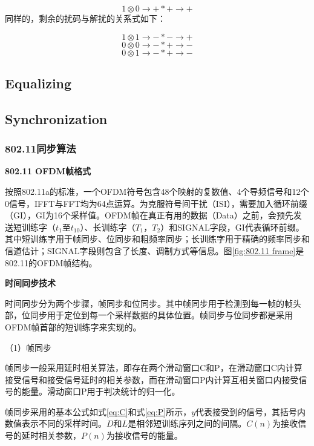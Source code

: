 \documentclass[titlepage]{article}
\numberwithin{figure}{section}
\numberwithin{equation}{section}
\begin{document}
\begin{displaymath}
1 \otimes 0 \to + * + \to +
\end{displaymath}
同样的，剩余的扰码与解扰的关系式如下：

\begin{displaymath}
1 \otimes 1 \to - * - \to +
\end{displaymath}
\begin{displaymath}
0 \otimes 0 \to - * + \to -
\end{displaymath}
\begin{displaymath}
0 \otimes 1 \to - * + \to - 
\end{displaymath}

\subsection{Equalizing}

\subsection{Synchronization}

\subsubsection{802.11同步算法}

\textbf{802.11 OFDM帧格式}

按照802.11a的标准，一个OFDM符号包含48个映射的复数值、4个导频信号和12个0信号，IFFT与FFT均为64点运算。为克服符号间干扰（ISI），需要加入循环前缀（GI），GI为16个采样值。OFDM帧在真正有用的数据（Data）之前，会预先发送短训练字（$t_{1}$至$t_{10}$）、长训练字（$T_{1}$，$T_{2}$）和SIGNAL字段，GI代表循环前缀。其中短训练字用于帧同步、位同步和粗频率同步；长训练字用于精确的频率同步和信道估计；SIGNAL字段则包含了长度、调制方式等信息。图\ref{fig:802.11 frame}是802.11的OFDM帧结构。

\textbf{时间同步技术}

时间同步分为两个步骤，帧同步和位同步。其中帧同步用于检测到每一帧的帧头部，位同步用于定位到每一个采样数据的具体位置。帧同步与位同步都是采用OFDM帧首部的短训练字来实现的。

（1）帧同步

帧同步一般采用延时相关算法，即存在两个滑动窗口C和P，在滑动窗口C内计算接受信号和接受信号延时的相关参数，而在滑动窗口P内计算互相关窗口内接受信号的能量。滑动窗口P用于判决统计的归一化。

帧同步采用的基本公式如式\ref{eq:C}和式\ref{eq:P}所示，$y$代表接受到的信号，其括号内数值表示不同的采样时间。$D$和$L$是相邻短训练序列之间的间隔。$C(n)$为接收信号的延时相关参数，$P(n)$为接收信号的能量。
\end{document}
